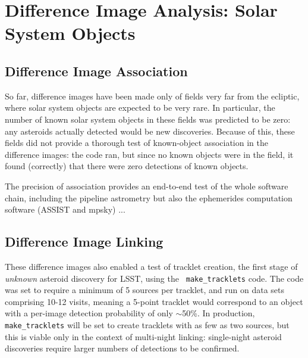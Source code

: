 \usepackage{graphicx}
\section{Difference Image Analysis: Solar System Objects}
\label{sec:dia_solar_system}

\subsection{Difference Image Association}
\label{sec:dia_solar_system_assoc}

So far, difference images have been made only of fields very far from the
ecliptic, where solar system objects are expected to be very rare.  In
particular, the number of known solar system objects in these fields was
predicted to be zero: any asteroids actually detected would be new
discoveries.  Because of this, these fields did not provide a thorough test
of known-object association in the difference images: the code ran, but
since no known objects were in the field, it found (correctly) that there
were zero detections of known objects.

The precision of association provides an end-to-end test of the whole
software chain, including the pipeline astrometry but also the ephemerides
computation software (ASSIST and mpsky) ...

\subsection{Difference Image Linking}
\label{sec:dia_solar_system_link}

These difference images also enabled a test of tracklet creation, the first
stage of {\em unknown} asteroid discovery for LSST, using the {\tt
make\_tracklets} code.  The code was set to require a minimum of 5 sources
per tracklet, and run on data sets comprising 10-12 visits, meaning a
5-point tracklet would correspond to an object with a per-image detection
probability of only $\sim$50\%.  In production, {\tt make\_tracklets} will
be set to create tracklets with as few as two sources, but this is viable
only in the context of multi-night linking: single-night asteroid
discoveries require larger numbers of detections to be confirmed.

